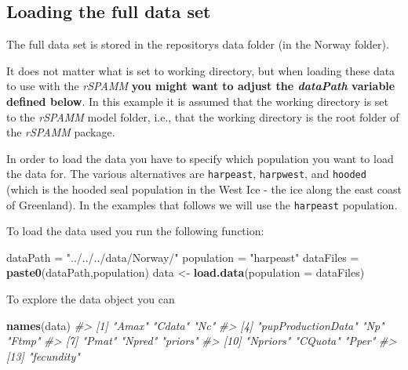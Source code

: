 \documentclass[
]{article}
\newenvironment{Shaded}{\begin{snugshade}}{\end{snugshade}}
\newcommand{\CommentTok}[1]{\textcolor[rgb]{0.56,0.35,0.01}{\textit{#1}}}
\newcommand{\DataTypeTok}[1]{\textcolor[rgb]{0.13,0.29,0.53}{#1}}
\newcommand{\KeywordTok}[1]{\textcolor[rgb]{0.13,0.29,0.53}{\textbf{#1}}}
\newcommand{\NormalTok}[1]{#1}
\newcommand{\StringTok}[1]{\textcolor[rgb]{0.31,0.60,0.02}{#1}}
\begin{document}
\hypertarget{loading-the-full-data-set}{%
\subsection{Loading the full data set}\label{loading-the-full-data-set}}

The full data set is stored in the repositorys data folder (in the
Norway folder).

It does not matter what is set to working directory, but when loading
these data to use with the \emph{rSPAMM} \textbf{you might want to
adjust the \emph{dataPath} variable defined below}. In this example it
is assumed that the working directory is set to the \emph{rSPAMM} model
folder, i.e., that the working directory is the root folder of the
\emph{rSPAMM} package.

In order to load the data you have to specify which population you want
to load the data for. The various alternatives are \texttt{harpeast},
\texttt{harpwest}, and \texttt{hooded} (which is the hooded seal
population in the West Ice - the ice along the east coast of Greenland).
In the examples that follows we will use the \texttt{harpeast}
population.

To load the data used you run the following function:

\begin{Shaded}
\begin{Highlighting}[]
\NormalTok{dataPath =}\StringTok{ "../../../data/Norway/"}
\NormalTok{population =}\StringTok{ "harpeast"}
\NormalTok{dataFiles =}\StringTok{ }\KeywordTok{paste0}\NormalTok{(dataPath,population)}
\NormalTok{data <-}\StringTok{ }\KeywordTok{load.data}\NormalTok{(}\DataTypeTok{population =}\NormalTok{ dataFiles)}
\end{Highlighting}
\end{Shaded}

To explore the data object you can

\begin{Shaded}
\begin{Highlighting}[]
\KeywordTok{names}\NormalTok{(data)}
\CommentTok{#>  [1] "Amax"              "Cdata"             "Nc"               }
\CommentTok{#>  [4] "pupProductionData" "Np"                "Ftmp"             }
\CommentTok{#>  [7] "Pmat"              "Npred"             "priors"           }
\CommentTok{#> [10] "Npriors"           "CQuota"            "Pper"             }
\CommentTok{#> [13] "fecundity"}
\end{Highlighting}
\end{Shaded}
\end{document}
